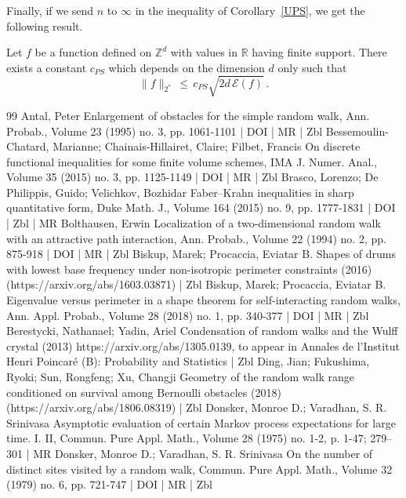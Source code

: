 \documentclass[10pt]{amsart}
\theoremstyle{definition}\newtheorem{defi}[theo]{Definition}\newtheorem{rema}[theo]{Remark}\newtheorem{exam}[theo]{Example}\newtheorem{exem}[theo]{Example}\newtheorem{nota}[theo]{Notation}
\newcommand*\Zd {{\mathbb Z^d}}
\newcommand*\R{\mathbb{R}}
\newcommand{\cE}{\mathcal{E}}
\begin{document}
Finally, if we send $n$ to $\infty$ in the inequality of Corollary~\ref{UPS}, we get the following result.
\begin{coro}\label{TPS}
Let $f$ be a function defined on $\Zd$ with values in $\R$ having finite support. There exists a constant $c_{PS}$ which depends on the dimension $d$ only such that
\[
\|f\|_{2^*}
\,\leq\,c_{PS}
\sqrt{2d\,\cE(f)}\,.
\]
\end{coro}



\begin{thebibliography}{99}
Antal, Peter Enlargement of obstacles for the simple random walk, Ann. Probab., Volume 23 (1995) no. 3, pp. 1061-1101 | DOI | MR | Zbl
Bessemoulin-Chatard, Marianne; Chainais-Hillairet, Claire; Filbet, Francis On discrete functional inequalities for some finite volume schemes, IMA J. Numer. Anal., Volume 35 (2015) no. 3, pp. 1125-1149 | DOI | MR | Zbl
Brasco, Lorenzo; De Philippis, Guido; Velichkov, Bozhidar Faber–Krahn inequalities in sharp quantitative form, Duke Math. J., Volume 164 (2015) no. 9, pp. 1777-1831 | DOI | Zbl | MR
Bolthausen, Erwin Localization of a two-dimensional random walk with an attractive path interaction, Ann. Probab., Volume 22 (1994) no. 2, pp. 875-918 | DOI | MR | Zbl
Biskup, Marek; Procaccia, Eviatar B. Shapes of drums with lowest base frequency under non-isotropic perimeter constraints (2016) (https://arxiv.org/abs/1603.03871) | Zbl
Biskup, Marek; Procaccia, Eviatar B. Eigenvalue versus perimeter in a shape theorem for self-interacting random walks, Ann. Appl. Probab., Volume 28 (2018) no. 1, pp. 340-377 | DOI | MR | Zbl
Berestycki, Nathanael; Yadin, Ariel Condensation of random walks and the Wulff crystal (2013) https://arxiv.org/abs/1305.0139, to appear in Annales de l’Institut Henri Poincaré (B): Probability and Statistics | Zbl
Ding, Jian; Fukushima, Ryoki; Sun, Rongfeng; Xu, Changji Geometry of the random walk range conditioned on survival among Bernoulli obstacles (2018) (https://arxiv.org/abs/1806.08319) | Zbl
Donsker, Monroe D.; Varadhan, S. R. Srinivasa Asymptotic evaluation of certain Markov process expectations for large time. I. II, Commun. Pure Appl. Math., Volume 28 (1975) no. 1-2, p. 1-47; 279–301 | MR
Donsker, Monroe D.; Varadhan, S. R. Srinivasa On the number of distinct sites visited by a random walk, Commun. Pure Appl. Math., Volume 32 (1979) no. 6, pp. 721-747 | DOI | MR | Zbl

\end{thebibliography}
\end{document}
